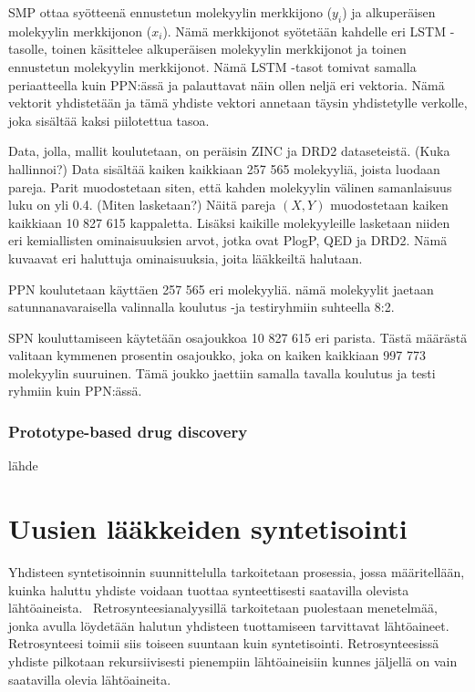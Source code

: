 \documentclass[finnish,twoside,censored,tkt,sw-line]{HYthesisML}
\begin{document}
SMP ottaa syötteenä ennustetun molekyylin merkkijono ($y_i$) ja alkuperäisen molekyylin merkkijonon ($x_i$).
Nämä merkkijonot syötetään kahdelle eri LSTM -tasolle, toinen käsittelee alkuperäisen molekyylin merkkijonot ja toinen ennustetun molekyylin merkkijonot.
Nämä LSTM -tasot tomivat samalla periaatteella kuin PPN:ässä ja palauttavat näin ollen neljä eri vektoria.
Nämä vektorit yhdistetään ja tämä yhdiste vektori annetaan täysin yhdistetylle verkolle, joka sisältää kaksi piilotettua tasoa.

Data, jolla, mallit koulutetaan, on peräisin ZINC ja DRD2 dataseteistä. (Kuka hallinnoi?)
Data sisältää kaiken kaikkiaan 257 565 molekyyliä, joista luodaan pareja.
Parit muodostetaan siten, että kahden molekyylin välinen samanlaisuus luku on yli 0.4. (Miten lasketaan?)
Näitä pareja $(X,Y)$ muodostetaan kaiken kaikkiaan 10 827 615 kappaletta.
Lisäksi kaikille molekyyleille lasketaan niiden eri kemiallisten ominaisuuksien arvot, jotka ovat PlogP, QED ja DRD2.
Nämä kuvaavat eri haluttuja ominaisuuksia, joita lääkkeiltä halutaan.

PPN koulutetaan käyttäen 257 565 eri molekyyliä.
nämä molekyylit jaetaan satunnanavaraisella valinnalla koulutus -ja testiryhmiin suhteella 8:2.

SPN kouluttamiseen käytetään osajoukkoa 10 827 615 eri parista.
Tästä määrästä valitaan kymmenen prosentin osajoukko, joka on kaiken kaikkiaan 997 773 molekyylin suuruinen.
Tämä joukko jaettiin samalla tavalla koulutus ja testi ryhmiin kuin PPN:ässä.

\subsection{Prototype-based drug discovery}

lähde~\cite{ShaharHarelAndKiraRadinsky}

\chapter{Uusien lääkkeiden syntetisointi}

Yhdisteen syntetisoinnin suunnittelulla tarkoitetaan prosessia, jossa määritellään, kuinka haluttu yhdiste voidaan tuottaa synteettisesti saatavilla olevista lähtöaineista.~\cite{ColeyConnorW2018MLiC}
Retrosynteesianalyysillä tarkoitetaan puolestaan menetelmää, jonka avulla löydetään halutun yhdisteen tuottamiseen tarvittavat lähtöaineet.
Retrosynteesi toimii siis toiseen suuntaan kuin syntetisointi.
Retrosynteesissä yhdiste pilkotaan rekursiivisesti pienempiin lähtöaineisiin kunnes jäljellä on vain saatavilla olevia lähtöaineita.
\end{document}
